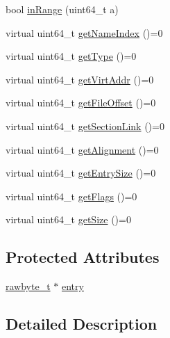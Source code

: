 \begin{DoxyCompactItemize}
bool \hyperlink{class_e_p_a_x_1_1_elf_1_1_section_header_aaeba234d199df23d8be4ab874e6a8bac}{in\-Range} (uint64\-\_\-t a)
\item 
virtual uint64\-\_\-t \hyperlink{class_e_p_a_x_1_1_elf_1_1_section_header_aac92cdabd70a208e45ff0b6920bee3e6}{get\-Name\-Index} ()=0
\item 
virtual uint64\-\_\-t \hyperlink{class_e_p_a_x_1_1_elf_1_1_section_header_af7e6230e8d4b68886ef8dcda238f1072}{get\-Type} ()=0
\item 
virtual uint64\-\_\-t \hyperlink{class_e_p_a_x_1_1_elf_1_1_section_header_a34bc5ee9fc05b1780e8cca68828bfc23}{get\-Virt\-Addr} ()=0
\item 
virtual uint64\-\_\-t \hyperlink{class_e_p_a_x_1_1_elf_1_1_section_header_a1beecb645d931ff31696e9994f1f0e06}{get\-File\-Offset} ()=0
\item 
virtual uint64\-\_\-t \hyperlink{class_e_p_a_x_1_1_elf_1_1_section_header_a035451e10f87faae8d772f8fda9e42d0}{get\-Section\-Link} ()=0
\item 
virtual uint64\-\_\-t \hyperlink{class_e_p_a_x_1_1_elf_1_1_section_header_a65a863f2eb15aa211d772fc1b3013d64}{get\-Alignment} ()=0
\item 
virtual uint64\-\_\-t \hyperlink{class_e_p_a_x_1_1_elf_1_1_section_header_a97327fc2deb88d4873bfa36b25864567}{get\-Entry\-Size} ()=0
\item 
virtual uint64\-\_\-t \hyperlink{class_e_p_a_x_1_1_elf_1_1_section_header_ab573a5f4b64afd5dc7f5b835c5b1becf}{get\-Flags} ()=0
\item 
virtual uint64\-\_\-t \hyperlink{class_e_p_a_x_1_1_elf_1_1_section_header_a2d9cd842c34c4075260116f0ab373fa2}{get\-Size} ()=0
\end{DoxyCompactItemize}
\subsection*{\-Protected \-Attributes}
\begin{DoxyCompactItemize}
\item 
\hyperlink{_e_p_a_x_common_internal_8hpp_a17755bdd71c02e656c667b16de61dd7b}{rawbyte\-\_\-t} $\ast$ \hyperlink{class_e_p_a_x_1_1_elf_1_1_section_header_a84d8a573ab3f70298e15d46e83197260}{entry}
\end{DoxyCompactItemize}


\subsection{\-Detailed \-Description}


